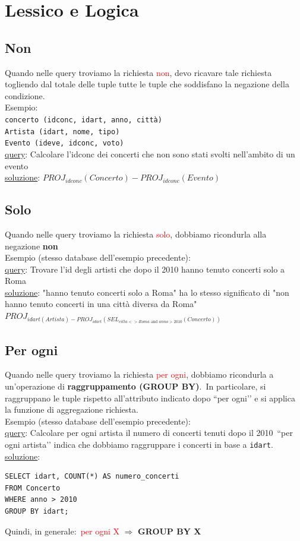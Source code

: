 \chapter{Lessico e Logica}
\section{Non}
Quando nelle query troviamo la richiesta \textcolor{red}{non}, devo ricavare tale richiesta togliendo dal totale delle tuple tutte le tuple 
che soddisfano la negazione della condizione.\\
\textcolor{verdeEsempio}{Esempio:}\\
\texttt{concerto (idconc, idart, anno, città)}\\
\texttt{Artista (idart, nome, tipo)}\\
\texttt{Evento (ideve, idconc, voto)}\\
\underline{query}: Calcolare l'idconc dei concerti che non sono stati svolti nell'ambito di un evento\\
\underline{soluzione}: $PROJ_{idconc}(Concerto)-PROJ_{idconc}(Evento )$
\section{Solo}
Quando nelle query troviamo la richiesta \textcolor{red}{solo}, dobbiamo ricondurla alla negazione \textbf{non}\\
\textcolor{verdeEsempio}{Esempio} (stesso database dell'esempio precedente):\\
\underline{query}: Trovare l'id degli artisti che dopo il 2010 hanno tenuto concerti solo a Roma\\
\underline{soluzione}: "hanno tenuto concerti solo a Roma" ha lo stesso significato di "non hanno tenuto concerti in una città diversa da Roma"\\
$PROJ_{idart(Artista)-PROJ_{idart}(SEL_{citta<>Roma \text{ and }anno>2010}(Concerto ))}$
\section{Per ogni}
Quando nelle query troviamo la richiesta \textcolor{red}{per ogni}, dobbiamo ricondurla a un’operazione di \textbf{raggruppamento (GROUP BY)}.\
In particolare, si raggruppano le tuple rispetto all’attributo indicato dopo ``per ogni’’ e si applica la funzione di aggregazione richiesta.\\
\textcolor{verdeEsempio}{Esempio} (stesso database dell’esempio precedente):\\
\underline{query}: Calcolare per ogni artista il numero di concerti tenuti dopo il 2010\
``per ogni artista’’ indica che dobbiamo raggruppare i concerti in base a \texttt{idart}.\\
\underline{soluzione}:\
\begin{verbatim}
SELECT idart, COUNT(*) AS numero_concerti
FROM Concerto
WHERE anno > 2010
GROUP BY idart;
\end{verbatim}
Quindi, in generale:\
\textcolor{red}{per ogni X} $\Rightarrow$ \textbf{GROUP BY X}

